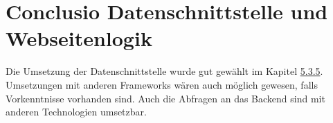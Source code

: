 \section{Conclusio Datenschnittstelle und Webseitenlogik}
Die Umsetzung der Datenschnittstelle wurde gut gewählt im Kapitel \hyperref[sec:rfoster_fazit]{5.3.5}. Umsetzungen mit anderen Frameworks wären auch möglich gewesen, falls Vorkenntnisse vorhanden sind. Auch die Abfragen an das Backend sind mit anderen Technologien umsetzbar.